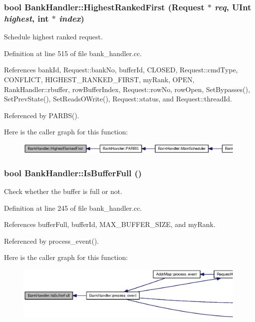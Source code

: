 \subsubsection[{HighestRankedFirst}]{\setlength{\rightskip}{0pt plus 5cm}bool BankHandler::HighestRankedFirst ({\bf Request} $\ast$ {\em req}, \/  {\bf UInt} {\em highest}, \/  int $\ast$ {\em index})}\label{classBankHandler_a4966de4e7e8d062be771c2382a55da6}


Schedule highest ranked request. 



Definition at line 515 of file bank\_\-handler.cc.

References bankId, Request::bankNo, bufferId, CLOSED, Request::cmdType, CONFLICT, HIGHEST\_\-RANKED\_\-FIRST, myRank, OPEN, RankHandler::rbuffer, rowBufferIndex, Request::rowNo, rowOpen, SetBypasses(), SetPrevState(), SetReadsOWrite(), Request::status, and Request::threadId.

Referenced by PARBS().

Here is the caller graph for this function:\nopagebreak
\begin{figure}[H]
\begin{center}
\leavevmode
\includegraphics[width=420pt]{classBankHandler_a4966de4e7e8d062be771c2382a55da6_icgraph}
\end{center}
\end{figure}
\subsubsection[{IsBufferFull}]{\setlength{\rightskip}{0pt plus 5cm}bool BankHandler::IsBufferFull ()}\label{classBankHandler_5e6e874552e1b4e71589c489257b154b}


Check whether the buffer is full or not. 



Definition at line 245 of file bank\_\-handler.cc.

References bufferFull, bufferId, MAX\_\-BUFFER\_\-SIZE, and myRank.

Referenced by process\_\-event().

Here is the caller graph for this function:\nopagebreak
\begin{figure}[H]
\begin{center}
\leavevmode
\includegraphics[width=420pt]{classBankHandler_5e6e874552e1b4e71589c489257b154b_icgraph}
\end{center}
\end{figure}
